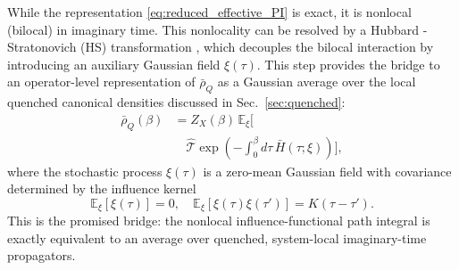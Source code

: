 While the representation \eqref{eq:reduced_effective_PI} is exact, it is nonlocal (bilocal) in imaginary time. This nonlocality can be resolved by a Hubbard - Stratonovich (HS) transformation \cite{hubbardCalculationPartitionFunctions1959a, stratonovich1957QDistro}, which decouples the bilocal interaction by introducing an auxiliary Gaussian field $\xi(\tau)$. This step provides the bridge to an operator-level representation of $\bar{\rho}_Q$ as a Gaussian average over the local quenched canonical densities discussed in Sec.~\ref{sec:quenched}:
\begin{equation}
\begin{split}
    \bar\rho_Q(\beta) 
    &= 
    Z_X(\beta)\,\mathbb E_\xi\bigg[ \\
    &\quad \hat{\mathcal{T}}\exp\!\left(-\int_0^\beta d\tau\,\bar{H}(\tau;\xi)\right) \bigg],
\end{split}
    \label{eq:bar_rho_as_quenched_average}
\end{equation}
where the stochastic process $\xi(\tau)$ is a zero-mean Gaussian field with covariance determined by the influence kernel \cite{mccaulPartitionfreeApproachOpen2017c,mccaulDrivingSpinbosonModels2018a,mccaulHowWinFriends2021b}
\begin{equation}
    \mathbb{E}_\xi[\xi(\tau)] = 0, \quad \mathbb{E}_\xi[\xi(\tau)\xi(\tau')] = K(\tau-\tau').
    \label{eq:noise_statistics}
\end{equation}
This is the promised bridge: the nonlocal influence-functional path integral is exactly equivalent to an average over quenched, system-local imaginary-time propagators.

